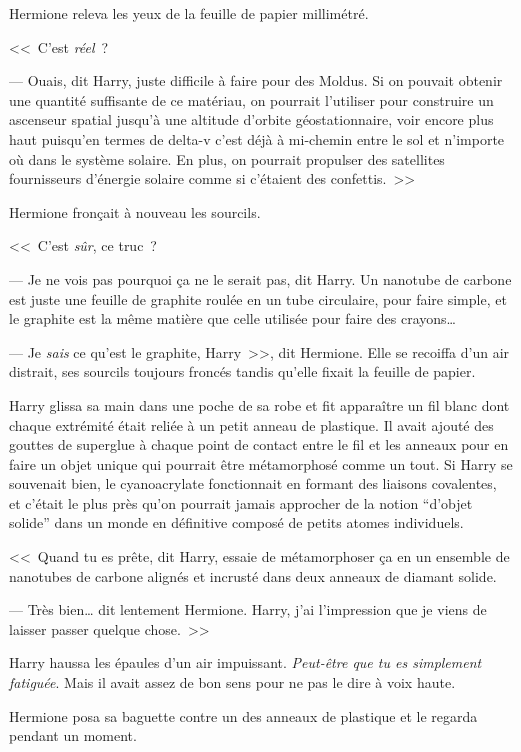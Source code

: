 Hermione releva les yeux de la feuille de papier millimétré.

<<~C'est \emph{réel}~?

--- Ouais, dit Harry, juste difficile à faire pour des Moldus. Si on pouvait obtenir une quantité suffisante de ce matériau, on pourrait l'utiliser pour construire un ascenseur spatial jusqu'à une altitude d'orbite géostationnaire, voir encore plus haut puisqu'en termes de delta-v c'est déjà à mi-chemin entre le sol et n'importe où dans le système solaire. En plus, on pourrait propulser des satellites fournisseurs d'énergie solaire comme si c'étaient des confettis.~>>

Hermione fronçait à nouveau les sourcils.

<<~C'est \emph{sûr}, ce truc~?

--- Je ne vois pas pourquoi ça ne le serait pas, dit Harry. Un nanotube de carbone est juste une feuille de graphite roulée en un tube circulaire, pour faire simple, et le graphite est la même matière que celle utilisée pour faire des crayons…

--- Je \emph{sais} ce qu'est le graphite, Harry~>>, dit Hermione. Elle se recoiffa d'un air distrait, ses sourcils toujours froncés tandis qu'elle fixait la feuille de papier.

Harry glissa sa main dans une poche de sa robe et fit apparaître un fil blanc dont chaque extrémité était reliée à un petit anneau de plastique. Il avait ajouté des gouttes de superglue à chaque point de contact entre le fil et les anneaux pour en faire un objet unique qui pourrait être métamorphosé comme un tout. Si Harry se souvenait bien, le cyanoacrylate fonctionnait en formant des liaisons covalentes, et c'était le plus près qu'on pourrait jamais approcher de la notion “d'objet solide” dans un monde en définitive composé de petits atomes individuels.

<<~Quand tu es prête, dit Harry, essaie de métamorphoser ça en un ensemble de nanotubes de carbone alignés et incrusté dans deux anneaux de diamant solide.

--- Très bien… dit lentement Hermione. Harry, j'ai l'impression que je viens de laisser passer quelque chose.~>>

Harry haussa les épaules d'un air impuissant. \emph{Peut-être que tu es simplement fatiguée}. Mais il avait assez de bon sens pour ne pas le dire à voix haute.

Hermione posa sa baguette contre un des anneaux de plastique et le regarda pendant un moment.


